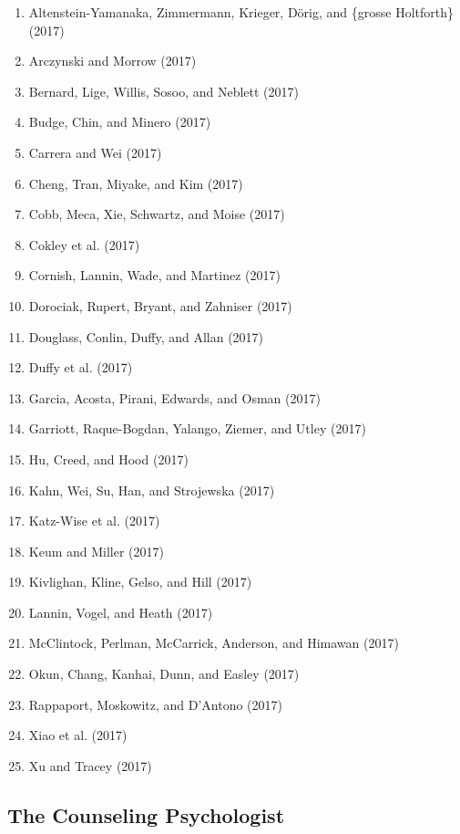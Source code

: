 \documentclass[english,man]{apa6}
\providecommand{\tightlist}{%
  \setlength{\itemsep}{0pt}\setlength{\parskip}{0pt}}
\theoremstyle{definition}
\theoremstyle{definition}
\theoremstyle{definition}
\theoremstyle{remark}
\begin{document}
\begin{enumerate}
\def\labelenumi{\arabic{enumi})}
\tightlist
\item
  Altenstein-Yamanaka, Zimmermann, Krieger, Dörig, and \{grosse
  Holtforth\} (2017)
\item
  Arczynski and Morrow (2017)
\item
  Bernard, Lige, Willis, Sosoo, and Neblett (2017)
\item
  Budge, Chin, and Minero (2017)
\item
  Carrera and Wei (2017)
\item
  Cheng, Tran, Miyake, and Kim (2017)
\item
  Cobb, Meca, Xie, Schwartz, and Moise (2017)
\item
  Cokley et al. (2017)
\item
  Cornish, Lannin, Wade, and Martinez (2017)
\item
  Dorociak, Rupert, Bryant, and Zahniser (2017)
\item
  Douglass, Conlin, Duffy, and Allan (2017)
\item
  Duffy et al. (2017)
\item
  Garcia, Acosta, Pirani, Edwards, and Osman (2017)
\item
  Garriott, Raque-Bogdan, Yalango, Ziemer, and Utley (2017)
\item
  Hu, Creed, and Hood (2017)
\item
  Kahn, Wei, Su, Han, and Strojewska (2017)
\item
  Katz-Wise et al. (2017)
\item
  Keum and Miller (2017)
\item
  Kivlighan, Kline, Gelso, and Hill (2017)
\item
  Lannin, Vogel, and Heath (2017)
\item
  McClintock, Perlman, McCarrick, Anderson, and Himawan (2017)
\item
  Okun, Chang, Kanhai, Dunn, and Easley (2017)
\item
  Rappaport, Moskowitz, and D'Antono (2017)
\item
  Xiao et al. (2017)
\item
  Xu and Tracey (2017)
\end{enumerate}

\subsection{The Counseling
Psychologist}\label{the-counseling-psychologist}
\end{document}
